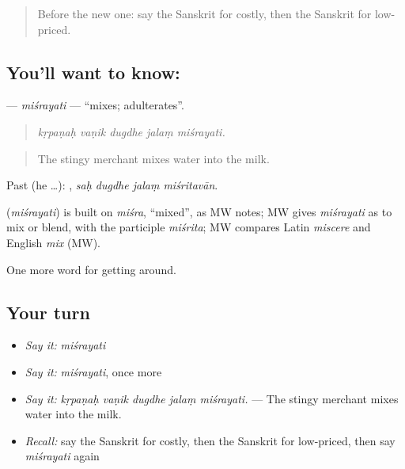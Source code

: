\begin{quote}
Before the new one: say the Sanskrit for costly, then the Sanskrit for low-priced.
\end{quote}

\subsection*{You'll want to know: }
\textbf{} — \emph{miśrayati} — \textquotedblleft{}mixes; adulterates\textquotedblright{}.

\begin{quote}
    
\end{quote}

\begin{quote}
\emph{kṛpaṇaḥ vaṇik dugdhe jalaṃ miśrayati.}
\end{quote}

\begin{quote}
The stingy merchant mixes water into the milk.
\end{quote}

Past (he …):    , \emph{saḥ dugdhe jalaṃ miśritavān}.

\begin{cousinweb}
\textbf{} (\emph{miśrayati}) is built on \emph{miśra}, \textquotedblleft{}mixed\textquotedblright{}, as MW notes; MW gives \emph{miśrayati} as to mix or blend, with the participle \emph{miśrita}; MW compares Latin \emph{miscere} and English \emph{mix} (MW).
\end{cousinweb}

\begin{grammarlens}[title={What you've built}]
One more word for getting around.
\end{grammarlens}

\subsection*{Your turn}
\begin{itemize}
\raggedright
  \item \emph{Say it:} \emph{miśrayati}
  \item \emph{Say it:} \emph{miśrayati}, once more
  \item \emph{Say it:} \emph{kṛpaṇaḥ vaṇik dugdhe jalaṃ miśrayati.} — The stingy merchant mixes water into the milk.
  \item \emph{Recall:} say the Sanskrit for costly, then the Sanskrit for low-priced, then say \emph{miśrayati} again
\end{itemize}

